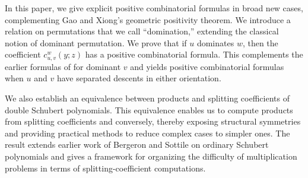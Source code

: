 \documentclass[reqno]{amsart}
\theoremstyle{definition}
\theoremstyle{remark}
\numberwithin{equation}{subsection}
\begin{document}
In this paper, we give explicit positive combinatorial formulas in broad new cases, complementing Gao and Xiong's geometric positivity theorem. We introduce a relation on permutations that we call ``domination,'' extending the classical notion of dominant permutation. We prove that if $u$ dominates $w$, then the coefficient $c^w_{u,v}(y;z)$ has a positive combinatorial formula. This complements the earlier formulas of \cite{samuelmolev} for dominant $v$ and yields positive combinatorial formulas when $u$ and $v$ have separated descents in either orientation.

We also establish an equivalence between products and splitting coefficients of double Schubert polynomials. This equivalence enables us to compute products from splitting coefficients and conversely, thereby exposing structural symmetries and providing practical methods to reduce complex cases to simpler ones. The result extends earlier work of Bergeron and Sottile on ordinary Schubert polynomials and gives a framework for organizing the difficulty of multiplication problems in terms of splitting-coefficient computations.

\end{document}

